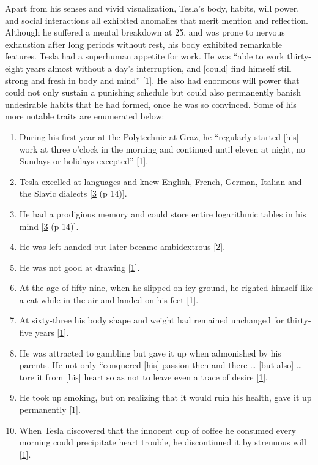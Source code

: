 \documentclass[
  a4paper,
]{article}
\providecommand{\tightlist}{%
  \setlength{\itemsep}{0pt}\setlength{\parskip}{0pt}}
\begin{document}
Apart from his senses and vivid visualization, Tesla's body, habits,
will power, and social interactions all exhibited anomalies that merit
mention and reflection. Although he suffered a mental breakdown at 25,
and was prone to nervous exhaustion after long periods without rest, his
body exhibited remarkable features. Tesla had a superhuman appetite for
work. He was ``able to work thirty-eight years almost without a day's
interruption, and {[}could{]} find himself still strong and fresh in
body and mind'' {[}\protect\hyperlink{ref-john83}{1}{]}. He also had
enormous will power that could not only sustain a punishing schedule but
could also permanently banish undesirable habits that he had formed,
once he was so convinced. Some of his more notable traits are enumerated
below:

\begin{enumerate}
\tightlist
\item
  During his first year at the Polytechnic at Graz, he ``regularly
  started {[}his{]} work at three o'clock in the morning and continued
  until eleven at night, no Sundays or holidays excepted''
  {[}\protect\hyperlink{ref-john83}{1}{]}.
\item
  Tesla excelled at languages and knew English, French, German, Italian
  and the Slavic dialects {[}\protect\hyperlink{ref-cheney81}{3} (p
  14){]}.
\item
  He had a prodigious memory and could store entire logarithmic tables
  in his mind {[}\protect\hyperlink{ref-cheney81}{3} (p 14){]}.
\item
  He was left-handed but later became ambidextrous
  {[}\protect\hyperlink{ref-oneill80}{2}{]}.
\item
  He was not good at drawing {[}\protect\hyperlink{ref-john83}{1}{]}.
\item
  At the age of fifty-nine, when he slipped on icy ground, he righted
  himself like a cat while in the air and landed on his feet
  {[}\protect\hyperlink{ref-john83}{1}{]}.
\item
  At sixty-three his body shape and weight had remained unchanged for
  thirty-five years {[}\protect\hyperlink{ref-john83}{1}{]}.
\item
  He was attracted to gambling but gave it up when admonished by his
  parents. He not only ``conquered {[}his{]} passion then and there
  \ldots{} {[}but also{]} \ldots{} tore it from {[}his{]} heart so as
  not to leave even a trace of desire
  {[}\protect\hyperlink{ref-john83}{1}{]}.
\item
  He took up smoking, but on realizing that it would ruin his health,
  gave it up permanently {[}\protect\hyperlink{ref-john83}{1}{]}.
\item
  When Tesla discovered that the innocent cup of coffee he consumed
  every morning could precipitate heart trouble, he discontinued it by
  strenuous will {[}\protect\hyperlink{ref-john83}{1}{]}.
\end{enumerate}
\end{document}

